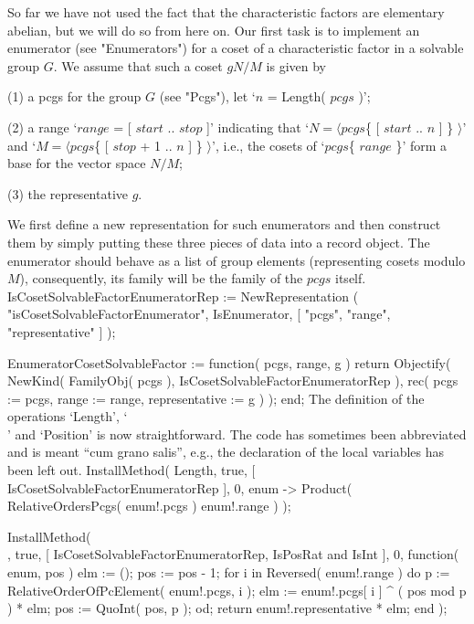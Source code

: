 \null

So far we have  not used  the  fact that  the characteristic factors  are
elementary abelian, but we will do so from here on. Our  first task is to
implement an   enumerator   (see  "Enumerators")   for  a   coset  of   a
characteristic factor   in a solvable  group  $G$. We assume that  such a
coset $gN/M$ is given by
{\medskip\frenchspacing
\item{(1)} a pcgs   for the group $G$  (see  "Pcgs"), let `$n$ =  Length(
  $pcgs$ )';
\item{(2)} a range `$range$ = [ $start$  .. $stop$ ]' indicating that `$N
  =  \langle pcgs$\{ [ $start$  .. $n$ ] \} $\rangle$'  and `$M = \langle
  pcgs$\{  [  $stop$ + 1   .. $n$ ]  \} $\rangle$',  i.e.,  the cosets of
  `$pcgs$\{ $range$ \}' form a base for the vector space $N/M$;
\item{(3)} the representative $g$.}
\medskip\noindent
We   first  define a  new representation  for   such enumerators and then
construct them by simply putting these three pieces of data into a record
object. The  enumerator  should  behave as  a   list of  group   elements
(representing cosets modulo $M$),   consequently, its family will  be the
family of the $pcgs$ itself.
\begintt
IsCosetSolvableFactorEnumeratorRep := NewRepresentation
    ( "isCosetSolvableFactorEnumerator", IsEnumerator,
                                [ "pcgs", "range", "representative" ] );

EnumeratorCosetSolvableFactor := function( pcgs, range, g )
    return Objectify( NewKind( FamilyObj( pcgs ),
                   IsCosetSolvableFactorEnumeratorRep ),
                   rec( pcgs := pcgs,
                       range := range,
              representative := g ) );
end;
\endtt
The definition of the operations `Length', `\\[\\]' and `Position' is now
straightforward. The  code has sometimes  been  abbreviated and is  meant
``cum grano salis'',  e.g.,  the declaration of  the local  variables has
been left out.
\begintt
InstallMethod( Length, true, [ IsCosetSolvableFactorEnumeratorRep ], 0,
    enum -> Product( RelativeOrdersPcgs( enum!.pcgs ){ enum!.range } ) );

InstallMethod( \[\], true, [ IsCosetSolvableFactorEnumeratorRep,
        IsPosRat and IsInt ], 0,
    function( enum, pos )
    elm := ();
    pos := pos - 1;
    for i  in Reversed( enum!.range )  do
        p := RelativeOrderOfPcElement( enum!.pcgs, i );
        elm := enum!.pcgs[ i ] ^ ( pos mod p ) * elm;
        pos := QuoInt( pos, p );
    od;
    return enum!.representative * elm;
end );

